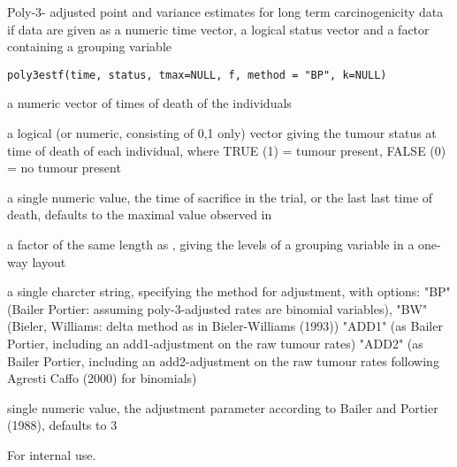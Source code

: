 \begin{Description}\relax
Poly-3- adjusted point and variance estimates for long term carcinogenicity data if data are given as a numeric time vector,
a logical status vector and a factor containing a grouping variable
\end{Description}
\begin{Usage}
\begin{verbatim}
poly3estf(time, status, tmax=NULL, f, method = "BP", k=NULL)
\end{verbatim}
\end{Usage}
\begin{Arguments}
\begin{ldescription}
\item[\code{time}] a numeric vector of times of death of the individuals
\item[\code{status}] a logical (or numeric, consisting of 0,1 only) vector giving the tumour status at time of death of each individual,
where TRUE (1) = tumour present, FALSE (0) = no tumour present  
\item[\code{tmax}] a single numeric value, the time of sacrifice in the trial, or the last last time of death, defaults to the maximal value observed in  
\item[\code{f}] a factor of the same length as  , giving the levels of a grouping variable in a one-way layout 
\item[\code{method}] a single charcter string, specifying the method for adjustment,
with options: "BP" (Bailer Portier: assuming poly-3-adjusted rates are binomial variables),
"BW" (Bieler, Williams: delta method as in Bieler-Williams (1993))
"ADD1" (as Bailer Portier, including an add1-adjustment on the raw tumour rates)
"ADD2" (as Bailer Portier, including an add2-adjustment on the raw tumour rates following Agresti Caffo (2000) for binomials)

\item[\code{k}] single numeric value, the adjustment parameter according to Bailer and Portier (1988), defaults to 3 
\end{ldescription}
\end{Arguments}
\begin{Details}\relax
For internal use.
\end{Details}
